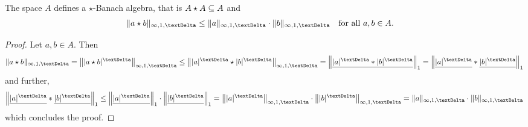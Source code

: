 \begin{theorem}
    The space $ A $ defines a $ \star $-Banach algebra,
    that is $ A \star A \subseteq A $ and
    \begin{align}
        \norm{ a \star b }_{\infi,1,\tDe}
        \leq
        \norm{ a }_{\infi,1,\tDe} \cdot \norm{ b }_{\infi,1,\tDe}
        &&&\text{for all $ a, b \in A $.}
    \end{align}
\end{theorem}

\begin{proof}
    Let $ a, b \in A $.
    Then
    \begin{align*}
        \norm{ a \star b }_{\infi,1,\tDe}
        =
        \Norm{ \absDi{ a \star b } }_{\infi,1,\tDe}
        \leq
        \Norm{ \absDi{ a } \star \absDi{ b } }_{\infi,1,\tDe}
        =
        \Norm{ \underline{ \absDi{ a } \conv \absDi{ b } } }_1
        =
        \Norm{ \underline{ \absDi{ a } } \conv
        \underline{ \absDi{ b } } }_1
    \end{align*}
    and further,
    \begin{align*}
        \Norm{ \underline{ \absDi{ a } } \conv
        \underline{ \absDi{ b } } }_1
        \leq
        \Norm{ \underline{ \absDi{ a } } }_1 \cdot
        \Norm{ \underline{ \absDi{ b } } }_1
        =
        \Norm{ \absDi{ a } }_{\infi,1,\tDe} \mult \Norm{ \absDi{ b } }_{\infi,1,\tDe}
        =
        \norm{ a }_{\infi,1,\tDe} \mult \norm{ b }_{\infi,1,\tDe}        
    \end{align*}
    which concludes the proof.
\end{proof}